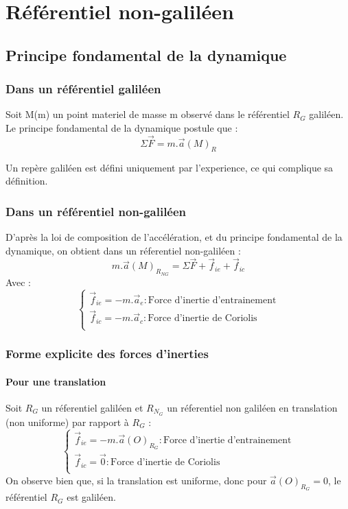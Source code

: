 \chapter{Référentiel non-galiléen}
\section{Principe fondamental de la dynamique}
\subsection{Dans un référentiel galiléen}
\begin{de}
Soit M(m) un point materiel de masse m observé dans le référentiel $R_G$ galiléen.\\
Le principe fondamental de la dynamique postule que :
$$\Sigma \overrightarrow{F} = m.\overrightarrow{a}(M)_R$$
\end{de}
\begin{prop}
Un repère galiléen est défini uniquement par l'experience, ce qui complique sa définition.
\end{prop}
\subsection{Dans un référentiel non-galiléen}
D'après la loi de composition de l'accélération, et du principe fondamental de la dynamique, on obtient dans un réferentiel non-galiléen :
$$m.\overrightarrow{a}(M)_{R_{NG}} = \Sigma \overrightarrow{F} + \overrightarrow{f}_{ie} + \overrightarrow{f}_{ic}$$
Avec : 
$$\left\{\begin{array}{l}
   \overrightarrow{f}_{ie} = -m.\overrightarrow{a}_e  : \mbox{Force d'inertie d'entrainement}\\
   \overrightarrow{f}_{ic} = -m.\overrightarrow{a}_c  : \mbox{Force d'inertie de Coriolis}\\
  \end{array}\right.$$
\subsection{Forme explicite des forces d'inerties}
\subsubsection{Pour une translation}
\begin{de}
Soit $R_G$ un réferentiel galiléen et $R_{N_G}$ un réferentiel non galiléen en translation (non uniforme) par rapport à $R_G$ : 
$$\left\{\begin{array}{l}
   \overrightarrow{f}_{ie} = -m.\overrightarrow{a}(O)_{R_G}  : \mbox{Force d'inertie d'entrainement}\\
   \overrightarrow{f}_{ic} = \overrightarrow{0}  : \mbox{Force d'inertie de Coriolis}\\
  \end{array}\right.$$
On observe bien que, si la translation est uniforme, donc pour $\overrightarrow{a}(O)_{R_G} = 0$, le référentiel $R_G$ est galiléen.
\end{de}
